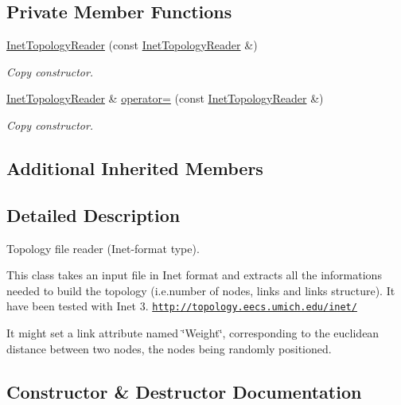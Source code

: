 \subsection*{Private Member Functions}
\begin{DoxyCompactItemize}
\item 
\hyperlink{classns3_1_1InetTopologyReader_adfff0c6ed306a0a3eebec973721f9bda}{Inet\+Topology\+Reader} (const \hyperlink{classns3_1_1InetTopologyReader}{Inet\+Topology\+Reader} \&)
\begin{DoxyCompactList}\small\item\em Copy constructor. \end{DoxyCompactList}\item 
\hyperlink{classns3_1_1InetTopologyReader}{Inet\+Topology\+Reader} \& \hyperlink{classns3_1_1InetTopologyReader_afe9d0899b00f192e4afb5820b3b78278}{operator=} (const \hyperlink{classns3_1_1InetTopologyReader}{Inet\+Topology\+Reader} \&)
\begin{DoxyCompactList}\small\item\em Copy constructor. \end{DoxyCompactList}\end{DoxyCompactItemize}
\subsection*{Additional Inherited Members}


\subsection{Detailed Description}
Topology file reader (Inet-\/format type). 

This class takes an input file in Inet format and extracts all the informations needed to build the topology (i.\+e.\+number of nodes, links and links structure). It have been tested with Inet 3. \href{http://topology.eecs.umich.edu/inet/}{\tt http\+://topology.\+eecs.\+umich.\+edu/inet/}

It might set a link attribute named \char`\"{}\+Weight\char`\"{}, corresponding to the euclidean distance between two nodes, the nodes being randomly positioned. 

\subsection{Constructor \& Destructor Documentation}
